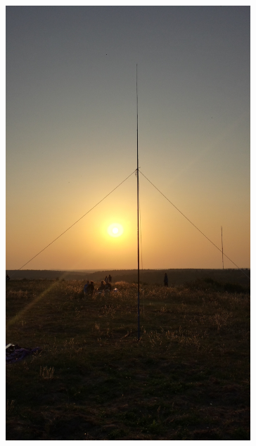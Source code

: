 \begin{frame}
\begin{columns}[c]
\begin{center}
\begin{figure}
        \includegraphics[width=0.82\textwidth,height=.75\textheight,keepaspectratio]{a09/db4um_Drachenberg.jpg}
      \end{figure}
    \end{center}
  \end{columns}
\end{frame}

